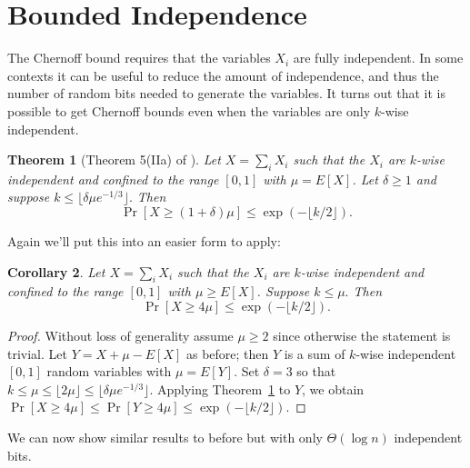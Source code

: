 \documentclass{article}
\newtheorem{theorem}{Theorem}
\newtheorem{corollary}[theorem]{Corollary}
\begin{document}
\section{Bounded Independence}

The Chernoff bound requires that the variables \(X_i\) are fully independent.
In some contexts it can be useful to reduce the amount of independence, and thus the number of random bits needed to generate the variables.
It turns out that it is possible to get Chernoff bounds even when the variables are only \(k\)-wise independent.

\begin{theorem}[Theorem 5(IIa) of \cite{limited-chernoff}]
  \label{thm:limited-chernoff}
  Let \(X = \sum_i X_i\) such that the \(X_i\) are \(k\)-wise independent and confined to the range \([0, 1]\) with \(\mu = E[X]\).
  Let \(\delta \ge 1\) and suppose \(k \le \lfloor \delta \mu e^{-1/3} \rfloor.\)
  Then \[\Pr[X \ge (1 + \delta)\mu] \le \exp(-\lfloor k/2 \rfloor).\]
\end{theorem}

Again we'll put this into an easier form to apply:

\begin{tcolorbox}
  \begin{corollary}
    \label{cor:limited-chernoff-simple}
    Let \(X = \sum_i X_i\) such that the \(X_i\) are \(k\)-wise independent and confined to the range \([0, 1]\) with \(\mu \ge E[X]\).
    Suppose \(k \le \mu.\)
    Then \[\Pr[X \ge 4\mu] \le \exp(-\lfloor k/2 \rfloor).\]
  \end{corollary}
\end{tcolorbox}
\begin{proof}
  Without loss of generality assume \(\mu \ge 2\) since otherwise the statement is trivial.
  Let \(Y = X + \mu - E[X]\) as before; then \(Y\) is a sum of \(k\)-wise independent \([0, 1]\) random variables with \(\mu = E[Y]\).
  Set \(\delta = 3\) so that \(k \le \mu \le \lfloor 2\mu \rfloor \le \lfloor \delta \mu e^{-1/3} \rfloor\).
  Applying Theorem~\ref{thm:limited-chernoff} to \(Y\), we obtain
  \(\Pr[X \ge 4\mu] \le \Pr[Y \ge 4\mu] \le \exp(-\lfloor k/2 \rfloor).\)
\end{proof}

We can now show similar results to before but with only \(\Theta(\log n)\) independent bits.
\end{document}
